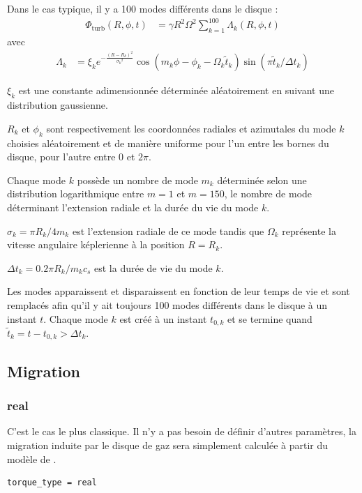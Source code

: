 Dans le cas typique, il y a 100 modes différents dans le disque : 
\begin{align}
\Phi_\text{turb}(R,\phi,t) &= \gamma R^2 \Omega^2 \sum_{k=1}^{100} \Lambda_k(R,\phi,t)
\end{align}
avec 
\begin{align}
\Lambda_k &= \xi_k e^{-\frac{(R-R_k)^2}{{\sigma_k}^2}} \cos\left(m_k \phi -\phi_k - \Omega_k\tilde{t}_k\right) \sin\left(\pi \tilde{t}_k/\Delta t_k\right)
\end{align}

$\xi_k$ est une constante adimensionnée déterminée aléatoirement en suivant une distribution gaussienne.

$R_k$ et $\phi_k$ sont respectivement les coordonnées radiales et azimutales du mode $k$ choisies aléatoirement et de manière uniforme pour l'un entre les bornes du disque, pour l'autre entre $0$ et $2\pi$. 

Chaque mode $k$ possède un nombre de mode $m_k$ déterminée selon une distribution logarithmique entre $m=1$ et $m=150$, le nombre de mode déterminant l'extension radiale et la durée du vie du mode $k$.

$\sigma_k = \pi R_k / 4m_k$ est l'extension radiale de ce mode tandis que $\Omega_k$ représente la vitesse angulaire képlerienne à la position $R=R_k$.

$\Delta t_k=0.2\pi R_k / m_k c_s$ est la durée de vie du mode $k$. 

\bigskip

Les modes apparaissent et disparaissent en fonction de leur temps de vie et sont remplacés afin qu'il y ait toujours 100 modes différents dans le disque à un instant $t$. Chaque mode $k$ est créé à un instant $t_{0,k}$ et se termine quand $\tilde{t}_k = t-t_{0,k} > \Delta t_k$.

\subsection{Migration}
\subsubsection{real}
C'est le cas le plus classique. Il n'y a pas besoin de définir d'autres paramètres, la migration induite par le disque de gaz sera simplement calculée à partir du modèle de \cite{paardekooper2011torque}.

\begin{verbatim}
torque_type = real
\end{verbatim}

